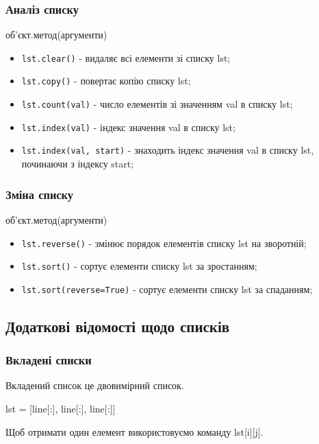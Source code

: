 \begin{frame}
\frametitle{Аналіз списку}
\begin{center}
об'єкт.метод(аргументи)
\end{center}
\begin{itemize}
        \item<1-> \texttt{lst.clear()} - видаляє всі елементи зі списку lst;
        \item<2-> \texttt{lst.copy()} - повертає копію списку lst;
        \item<3-> \texttt{lst.count(val)} - число елементів зі значенням val в списку lst;
        \item<4-> \texttt{lst.index(val)} - індекс значення val в списку lst;
        \item<4-> \texttt{lst.index(val, start)} - знаходить індекс значення val в списку lst, починаючи з індексу start;
    \end{itemize}
\end{frame}

\begin{frame}
\frametitle{Зміна списку}
\begin{center}
об'єкт.метод(аргументи)
\end{center}
\begin{itemize}
        \item<1-> \texttt{lst.reverse()} - змінює порядок елементів списку lst на зворотній;
        \item<2-> \texttt{lst.sort()} - сортує елементи списку lst за зростанням;
        \item<2-> \texttt{lst.sort(reverse=True)} - сортує елементи списку lst за спаданням;
    \end{itemize}
\end{frame}

\subsection{Додаткові відомості щодо списків} 

\begin{frame}
\frametitle{Вкладені списки} 
\begin{center}
Вкладений список це двовимірний список.

\vspace{1cm}

\Large
lst = [line[:], line[:], line[:]]
\normalsize

\vspace{1cm}

Щоб отримати один елемент використовуємо команду lst[i][j]. 
\end{center}

\end{frame}

